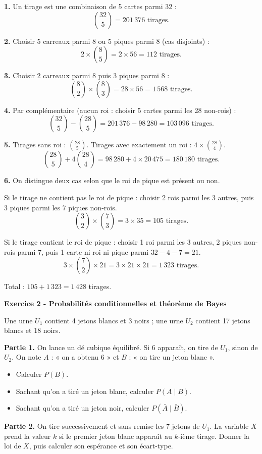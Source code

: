 \documentclass[12pt,a4paper]{article}
\begin{document}
\begin{boitecorrige}
\textbf{1.} Un tirage est une combinaison de 5 cartes parmi 32 :
\[
\binom{32}{5} = 201\,376 \text{ tirages.}
\]

\textbf{2.} Choisir 5 carreaux parmi 8 ou 5 piques parmi 8 (cas disjoints) :
\[
2 \times \binom{8}{5} = 2 \times 56 = 112 \text{ tirages.}
\]

\textbf{3.} Choisir 2 carreaux parmi 8 puis 3 piques parmi 8 :
\[
\binom{8}{2} \times \binom{8}{3} = 28 \times 56 = 1\,568 \text{ tirages.}
\]

\textbf{4.} Par complémentaire (aucun roi : choisir 5 cartes parmi les 28 non-rois) :
\[
\binom{32}{5} - \binom{28}{5} = 201\,376 - 98\,280 = 103\,096 \text{ tirages.}
\]

\textbf{5.} Tirages sans roi : $\binom{28}{5}$. Tirages avec exactement un roi : $4 \times \binom{28}{4}$.
\[
\binom{28}{5} + 4\binom{28}{4} = 98\,280 + 4 \times 20\,475 = 180\,180 \text{ tirages.}
\]

\textbf{6.} On distingue deux cas selon que le roi de pique est présent ou non.

Si le tirage ne contient pas le roi de pique : choisir 2 rois parmi les 3 autres, puis 3 piques parmi les 7 piques non-rois.
\[
\binom{3}{2} \times \binom{7}{3} = 3 \times 35 = 105 \text{ tirages.}
\]

Si le tirage contient le roi de pique : choisir 1 roi parmi les 3 autres, 2 piques non-rois parmi 7, puis 1 carte ni roi ni pique parmi $32 - 4 - 7 = 21$.
\[
3 \times \binom{7}{2} \times 21 = 3 \times 21 \times 21 = 1\,323 \text{ tirages.}
\]

Total : $105 + 1\,323 = 1\,428$ tirages.
\end{boitecorrige}

\begin{boiteexercice}
\textbf{Exercice 2 - Probabilités conditionnelles et théorème de Bayes}\niveau{\moyen}

Une urne $U_1$ contient 4 jetons blancs et 3 noirs ; une urne $U_2$ contient 17 jetons blancs et 18 noirs.

\textbf{Partie 1.} On lance un dé cubique équilibré. Si 6 apparaît, on tire de $U_1$, sinon de $U_2$. On note $A$ : « on a obtenu 6 » et $B$ : « on tire un jeton blanc ».
\begin{itemize}
  \item[a.] Calculer $P(B)$.
  \item[b.] Sachant qu'on a tiré un jeton blanc, calculer $P(A \mid B)$.
  \item[c.] Sachant qu'on a tiré un jeton noir, calculer $P(\bar{A} \mid \bar{B})$.
\end{itemize}

\textbf{Partie 2.} On tire successivement et sans remise les 7 jetons de $U_1$. La variable $X$ prend la valeur $k$ si le premier jeton blanc apparaît au $k$-ième tirage. Donner la loi de $X$, puis calculer son espérance et son écart-type.
\end{boiteexercice}
\end{document}
